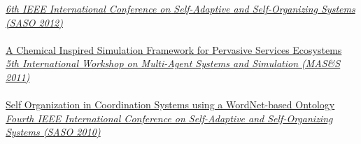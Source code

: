 \href{http://saso2012.univ-lyon1.fr/}{\textit{6th IEEE International Conference on Self-Adaptive and Self-Organizing Systems (SASO 2012)}}
\\ \halfblankline \\
\href{http://apice.unibo.it/xwiki/bin/view/Talks/PianiniMass2011}{A Chemical Inspired Simulation Framework for Pervasive Services Ecosystems} \\
\href{https://fedcsis.org/2011/}{\textit{5th International Workshop on Multi-Agent Systems and Simulation (MAS\&S 2011)}}
\\ \halfblankline \\
\href{http://apice.unibo.it/xwiki/bin/view/Talks/PianiniVirrusoSASO10}{Self Organization in Coordination Systems using a WordNet-based Ontology} \\
\href{http://www.inf.u-szeged.hu/projectdirs/saso10/}{\textit{Fourth IEEE International Conference on Self-Adaptive and Self-Organizing Systems (SASO 2010)}}

